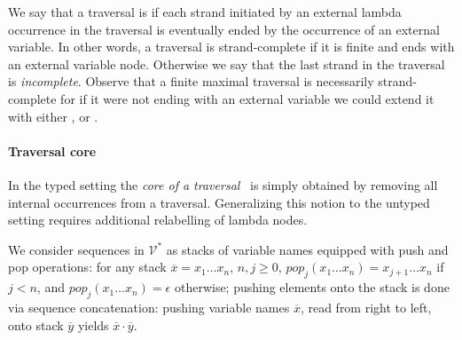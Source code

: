 \documentclass{elsarticle}
\theoremstyle{plain}
\theoremstyle{definition}
\newcommand\VarSet{\mathcal{V}}
\begin{document}
We say that a traversal is 
if each strand initiated by an external lambda occurrence in the traversal
is eventually ended by the occurrence of an external variable.
In other words, a traversal is strand-complete
if it is finite and ends with an external variable node.
Otherwise we say that the last strand in the traversal is \emph{incomplete}.
%
Observe that a finite maximal traversal
is necessarily strand-complete for if it were not ending with an external variable we could extend it with either ,  or .
%

\paragraph{Traversal core}

In the typed setting the \emph{core of a traversal}~\cite{BlumPhd} is simply obtained by removing all internal occurrences from a traversal.
Generalizing this notion to the untyped setting requires
additional relabelling of lambda nodes.

We consider sequences in $\VarSet^*$ as stacks of variable names equipped with  push and pop operations: for any stack $\overline{x} = x_1 \ldots x_n$, $n,j\geq0$, $pop_j (x_1 \ldots x_n) = x_{j+1} \ldots x_n$ if $j<n$, and $pop_j (x_1 \ldots x_n) = \epsilon$ otherwise;
pushing elements onto the stack is done via sequence concatenation:
 pushing  variable names $\overline{x}$, read from right to left, onto stack $\overline{y}$ yields  $\overline{x} \cdot \overline{y}$.
\end{document}
